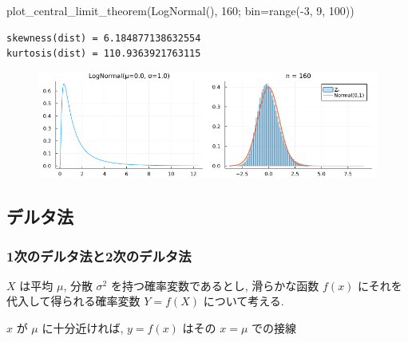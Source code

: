 \documentclass[
  letterpaper,
  DIV=11,
  numbers=noendperiod]{scrartcl}
\newenvironment{Shaded}{\begin{snugshade}}{\end{snugshade}}
\newcommand{\FloatTok}[1]{\textcolor[rgb]{0.68,0.00,0.00}{#1}}
\newcommand{\FunctionTok}[1]{\textcolor[rgb]{0.28,0.35,0.67}{#1}}
\newcommand{\NormalTok}[1]{\textcolor[rgb]{0.00,0.23,0.31}{#1}}
\newcommand{\OperatorTok}[1]{\textcolor[rgb]{0.37,0.37,0.37}{#1}}
\begin{document}
\begin{Shaded}
\begin{Highlighting}[]
\FunctionTok{plot\_central\_limit\_theorem}\NormalTok{(}\FunctionTok{LogNormal}\NormalTok{(), }\FloatTok{160}\NormalTok{; bin}\OperatorTok{=}\FunctionTok{range}\NormalTok{(}\OperatorTok{{-}}\FloatTok{3}\NormalTok{, }\FloatTok{9}\NormalTok{, }\FloatTok{100}\NormalTok{))}
\end{Highlighting}
\end{Shaded}

\begin{verbatim}
skewness(dist) = 6.184877138632554
kurtosis(dist) = 110.9363921763115
\end{verbatim}

\begin{figure}[H]

{\centering \includegraphics{05 Central limit theorem_files/figure-pdf/cell-92-output-2.png}

}

\end{figure}

\hypertarget{ux30c7ux30ebux30bfux6cd5}{%
\subsection{デルタ法}\label{ux30c7ux30ebux30bfux6cd5}}

\hypertarget{ux6b21ux306eux30c7ux30ebux30bfux6cd5ux30682ux6b21ux306eux30c7ux30ebux30bfux6cd5}{%
\subsubsection{1次のデルタ法と2次のデルタ法}\label{ux6b21ux306eux30c7ux30ebux30bfux6cd5ux30682ux6b21ux306eux30c7ux30ebux30bfux6cd5}}

\(X\) は平均 \(\mu\), 分散 \(\sigma^2\) を持つ確率変数であるとし,
滑らかな函数 \(f(x)\) にそれを代入して得られる確率変数 \(Y=f(X)\)
について考える.

\(x\) が \(\mu\) に十分近ければ, \(y = f(x)\) はその \(x = \mu\)
での接線
\end{document}
